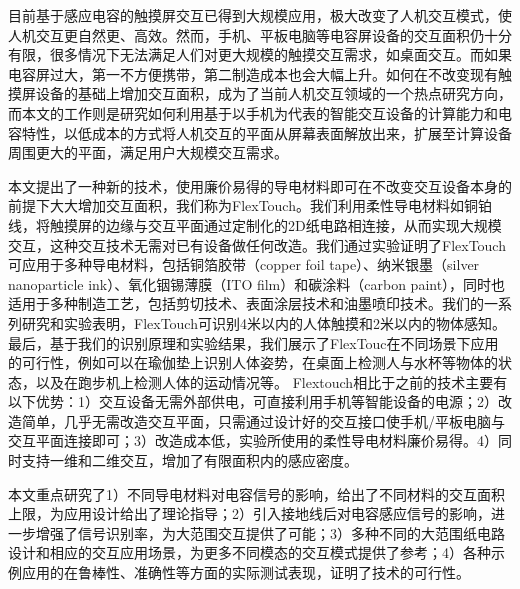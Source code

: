 \begin{cabstract}
  目前基于感应电容的触摸屏交互已得到大规模应用，极大改变了人机交互模式，使人机交互更自然更、高效。然而，手机、平板电脑等电容屏设备的交互面积仍十分有限，很多情况下无法满足人们对更大规模的触摸交互需求，如桌面交互。而如果电容屏过大，第一不方便携带，第二制造成本也会大幅上升。如何在不改变现有触摸屏设备的基础上增加交互面积，成为了当前人机交互领域的一个热点研究方向，而本文的工作则是研究如何利用基于以手机为代表的智能交互设备的计算能力和电容特性，以低成本的方式将人机交互的平面从屏幕表面解放出来，扩展至计算设备周围更大的平面，满足用户大规模交互需求。

  本文提出了一种新的技术，使用廉价易得的导电材料即可在不改变交互设备本身的前提下大大增加交互面积，我们称为FlexTouch。我们利用柔性导电材料如铜铂线，将触摸屏的边缘与交互平面通过定制化的2D纸电路相连接，从而实现大规模交互，这种交互技术无需对已有设备做任何改造。我们通过实验证明了FlexTouch可应用于多种导电材料，包括铜箔胶带（copper foil tape）、纳米银墨（silver nanoparticle ink）、氧化铟锡薄膜（ITO film）和碳涂料（carbon paint），同时也适用于多种制造工艺，包括剪切技术、表面涂层技术和油墨喷印技术。我们的一系列研究和实验表明，FlexTouch可识别4米以内的人体触摸和2米以内的物体感知。最后，基于我们的识别原理和实验结果，我们展示了FlexTouc在不同场景下应用的可行性，例如可以在瑜伽垫上识别人体姿势，在桌面上检测人与水杯等物体的状态，以及在跑步机上检测人体的运动情况等。 Flextouch相比于之前的技术主要有以下优势：1）交互设备无需外部供电，可直接利用手机等智能设备的电源；2）改造简单，几乎无需改造交互平面，只需通过设计好的交互接口使手机/平板电脑与交互平面连接即可；3）改造成本低，实验所使用的柔性导电材料廉价易得。4）同时支持一维和二维交互，增加了有限面积内的感应密度。
    
  本文重点研究了1）不同导电材料对电容信号的影响，给出了不同材料的交互面积上限，为应用设计给出了理论指导；2）引入接地线后对电容感应信号的影响，进一步增强了信号识别率，为大范围交互提供了可能；3）多种不同的大范围纸电路设计和相应的交互应用场景，为更多不同模态的交互模式提供了参考；4）各种示例应用的在鲁棒性、准确性等方面的实际测试表现，证明了技术的可行性。
    
\end{cabstract}


